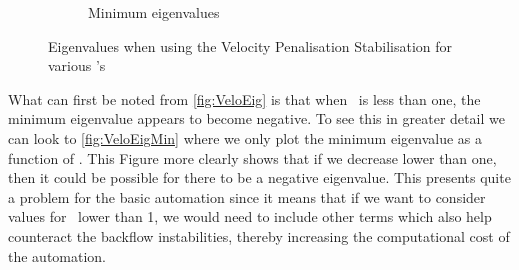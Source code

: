\begin{figure}[ht]
\begin{subfigure}[h]{0.49\textwidth}
        \caption{Minimum eigenvalues\label{fig:VeloEigMin}}
     \end{subfigure}
        \caption{Eigenvalues when using the Velocity Penalisation Stabilisation for various \mbeta's}
        \label{fig:VeloEigmulti}
\end{figure}
What can first be noted from \autoref{fig:VeloEig} is that when \mbeta~is less than one, the minimum eigenvalue appears to become negative. To see this in greater detail we can look to \autoref{fig:VeloEigMin} where we only plot the minimum eigenvalue as a function of \mbeta. This Figure more clearly shows that if we decrease \mbeta lower than one, then it could be possible for there to be a negative eigenvalue. This presents quite a problem for the basic automation since it means that if we want to consider values for \mbeta~lower than 1, we would need to include other terms which also help counteract the backflow instabilities, thereby increasing the computational cost of the automation.

